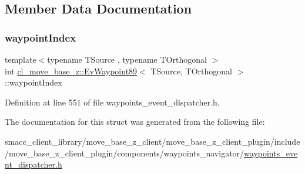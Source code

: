 \subsection{Member Data Documentation}
\mbox{\label{structcl__move__base__z_1_1EvWaypoint89_a1fcb57c519d7e3469bb1242352b04bd4}} 
\subsubsection{\texorpdfstring{waypoint\+Index}{waypointIndex}}
{\footnotesize\ttfamily template$<$typename T\+Source , typename T\+Orthogonal $>$ \\
int \hyperlink{structcl__move__base__z_1_1EvWaypoint89}{cl\+\_\+move\+\_\+base\+\_\+z\+::\+Ev\+Waypoint89}$<$ T\+Source, T\+Orthogonal $>$\+::waypoint\+Index}



Definition at line 551 of file waypoints\+\_\+event\+\_\+dispatcher.\+h.



The documentation for this struct was generated from the following file\+:\begin{DoxyCompactItemize}
\item 
smacc\+\_\+client\+\_\+library/move\+\_\+base\+\_\+z\+\_\+client/move\+\_\+base\+\_\+z\+\_\+client\+\_\+plugin/include/move\+\_\+base\+\_\+z\+\_\+client\+\_\+plugin/components/waypoints\+\_\+navigator/\hyperlink{waypoints__event__dispatcher_8h}{waypoints\+\_\+event\+\_\+dispatcher.\+h}\end{DoxyCompactItemize}
